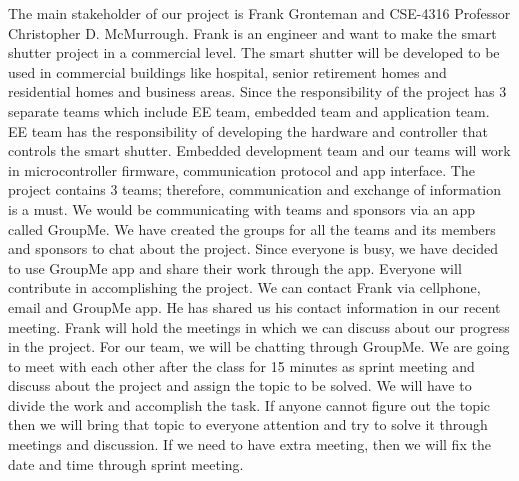 The main stakeholder of our project is Frank Gronteman and CSE-4316 Professor Christopher D. McMurrough. Frank is an engineer and want to make the smart shutter project in a commercial level. The smart shutter will be developed to be used in commercial buildings like hospital, senior retirement homes and residential homes and business areas. \newline
Since the responsibility of the project has 3 separate teams which include EE team, embedded team and application team. EE team has the responsibility of developing the hardware and controller that controls the smart shutter. Embedded development team and our teams will work in microcontroller firmware, communication protocol and app interface. The project contains 3 teams; therefore, communication and exchange of information is a must. We would be communicating with teams and sponsors via an app called GroupMe. We have created the groups for all the teams and its members and sponsors to chat about the project. \newline
Since everyone is busy, we have decided to use GroupMe app and share their work through the app. Everyone will contribute in accomplishing the project. We can contact Frank via cellphone, email and GroupMe app. He has shared us his contact information in our recent meeting. Frank will hold the meetings in which we can discuss about our progress in the project. \newline
For our team, we will be chatting through GroupMe. We are going to meet with each other after the class for 15 minutes as sprint meeting and discuss about the project and assign the topic to be solved. We will have to divide the work and accomplish the task. If anyone cannot figure out the topic then we will bring that topic to everyone attention and try to solve it through meetings and discussion. If we need to have extra meeting, then we will fix the date and time through sprint meeting. \newline

